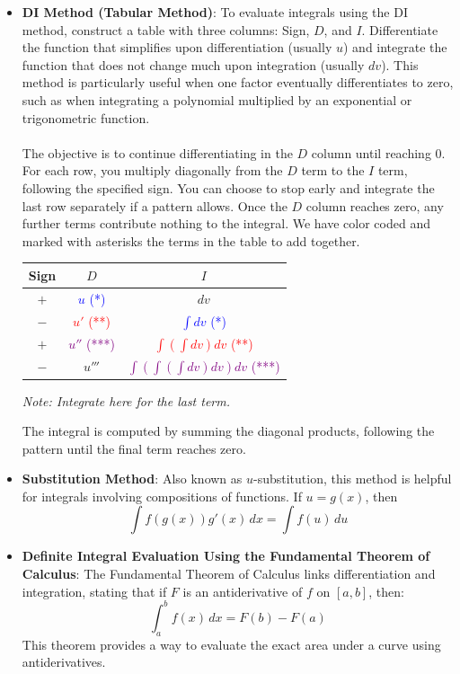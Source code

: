 \begin{itemize}
\item \textbf{DI Method (Tabular Method)}: 
To evaluate integrals using the DI method, construct a table with three columns: Sign, $D$, and $I$. Differentiate the function that simplifies upon differentiation (usually $u$) and integrate the function that does not change much upon integration (usually $dv$). This method is particularly useful when one factor eventually differentiates to zero, such as when integrating a polynomial multiplied by an exponential or trigonometric function. \\ \\ The objective is to continue differentiating in the $D$ column until reaching 0. For each row, you multiply diagonally from the $D$ term to the $I$ term, following the specified sign. You can choose to stop early and integrate the last row separately if a pattern allows. Once the $D$ column reaches zero, any further terms contribute nothing to the integral. We have color coded and marked with asterisks the terms in the table to add together.

\vspace{1em}
\begin{center}
\begin{tabular}{|c|c|c|}
\hline
Sign & $D$ & $I$ \\
\hline
$+$ & \textcolor{blue}{$u$ (*)} & {$dv$} \\
$-$ & \textcolor{red}{$u'$ (**) } & \textcolor{blue}{$\int dv$ (*) } \\
$+$ & \textcolor{purple}{$u''$ (***)} & \textcolor{red}{$\int \left(\int dv\right) dv $ (**)} \\
$-$ & {$u'''$} & \textcolor{purple}{$\int \left(\int \left(\int dv\right) dv \right) dv$ (***)} \\
\hline
\end{tabular}
\end{center}
\begin{center}
\textit{Note: Integrate here for the last term.}
\end{center}

The integral is computed by summing the diagonal products, following the pattern until the final term reaches zero.





\vspace{1em}
\item \textbf{Substitution Method}: 
Also known as \( u \)-substitution, this method is helpful for integrals involving compositions of functions. If \( u = g(x) \), then
\[
\int f(g(x)) g'(x) \, dx = \int f(u) \, du
\]


\item \textbf{Definite Integral Evaluation Using the Fundamental Theorem of Calculus}:
The Fundamental Theorem of Calculus links differentiation and integration, stating that if \( F \) is an antiderivative of \( f \) on \([a, b]\), then:
\[
\int_a^b f(x) \, dx = F(b) - F(a)
\]
This theorem provides a way to evaluate the exact area under a curve using antiderivatives.

\end{itemize}


